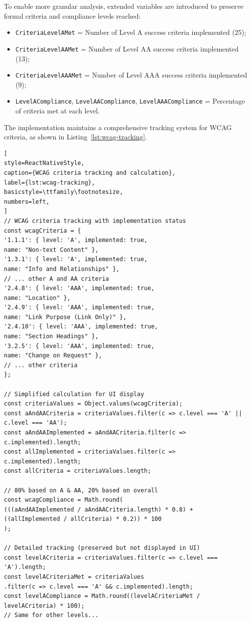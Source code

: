 To enable more granular analysis, extended variables are introduced to preserve formal criteria and compliance levels reached:
\begin{itemize}
\item \texttt{CriteriaLevelAMet} = Number of Level A success criteria implemented (25);
\item \texttt{CriteriaLevelAAMet} = Number of Level AA success criteria implemented (13);
\item \texttt{CriteriaLevelAAAMet} = Number of Level AAA success criteria implemented (9);
\item \texttt{LevelACompliance}, \texttt{LevelAACompliance}, \texttt{LevelAAACompliance} = Percentage of criteria met at each level.
\end{itemize}

The implementation maintains a comprehensive tracking system for WCAG criteria, as shown in Listing~\ref{lst:wcag-tracking}.
\begin{lstlisting}[
style=ReactNativeStyle,
caption={WCAG criteria tracking and calculation},
label={lst:wcag-tracking},
basicstyle=\ttfamily\footnotesize,
numbers=left,
]
// WCAG criteria tracking with implementation status
const wcagCriteria = {
'1.1.1': { level: 'A', implemented: true,
name: "Non-text Content" },
'1.3.1': { level: 'A', implemented: true,
name: "Info and Relationships" },
// ... other A and AA criteria
'2.4.8': { level: 'AAA', implemented: true,
name: "Location" },
'2.4.9': { level: 'AAA', implemented: true,
name: "Link Purpose (Link Only)" },
'2.4.10': { level: 'AAA', implemented: true,
name: "Section Headings" },
'3.2.5': { level: 'AAA', implemented: true,
name: "Change on Request" },
// ... other criteria
};

// Simplified calculation for UI display
const criteriaValues = Object.values(wcagCriteria);
const aAndAACriteria = criteriaValues.filter(c => c.level === 'A' || c.level === 'AA');
const aAndAAImplemented = aAndAACriteria.filter(c => c.implemented).length;
const allImplemented = criteriaValues.filter(c => c.implemented).length;
const allCriteria = criteriaValues.length;

// 80% based on A & AA, 20% based on overall
const wcagCompliance = Math.round(
(((aAndAAImplemented / aAndAACriteria.length) * 0.8) +
((allImplemented / allCriteria) * 0.2)) * 100
);

// Detailed tracking (preserved but not displayed in UI)
const levelACriteria = criteriaValues.filter(c => c.level === 'A').length;
const levelACriteriaMet = criteriaValues
.filter(c => c.level === 'A' && c.implemented).length;
const levelACompliance = Math.round((levelACriteriaMet / levelACriteria) * 100);
// Same for other levels...

\end{lstlisting}

